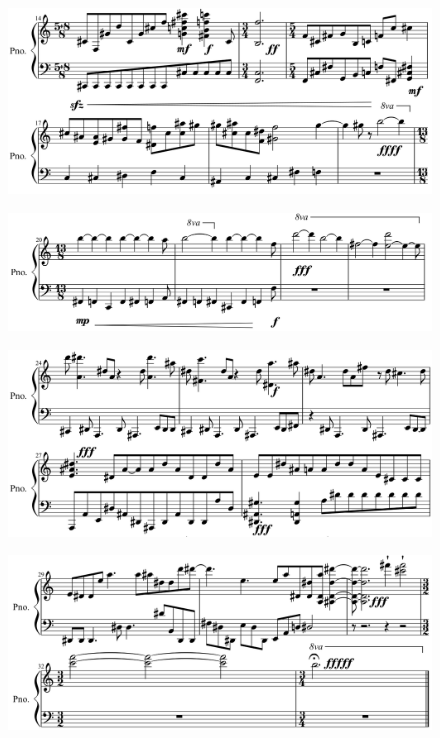 \documentclass[
	12pt,				%
	openright,			%
	twoside,			%
	a4paper,			%
	english,			%
	french,				%
	spanish,			%
	brazil				%
	]{abntex2}
\begin{document}
\begin{figure}[!h]
	\begin{center}
	    \includegraphics*[scale=0.35]{score/epigrafe02.png}
	\end{center}
\end{figure}


\pagebreak
\begin{figure}[!h]
	\begin{center}
	    \includegraphics*[scale=0.35]{score/epigrafe03.png}
	\end{center}
\end{figure}

\begin{figure}[!h]
	\begin{center}
	    \includegraphics*[scale=0.35]{score/epigrafe04.png}
	\end{center}
\end{figure}


\begin{figure}[!h]
	\begin{center}
	    \includegraphics*[scale=0.35]{score/epigrafe05.png}
	\end{center}
\end{figure}
\end{document}
